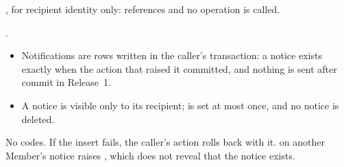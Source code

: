 {\sloppy {}, for recipient identity only:  references  and no operation is called.\par}

.

\begin{itemize}
\item Notifications are rows written in the caller's transaction: a notice exists exactly when the action that raised it committed, and nothing is sent after commit in Release~1.
\item A notice is visible only to its recipient;  is set at most once, and no notice is deleted.
\end{itemize}

{\sloppy No  codes. If the insert fails, the caller's action rolls back with it.  on another Member's notice raises , which does not reveal that the notice exists.\par}
